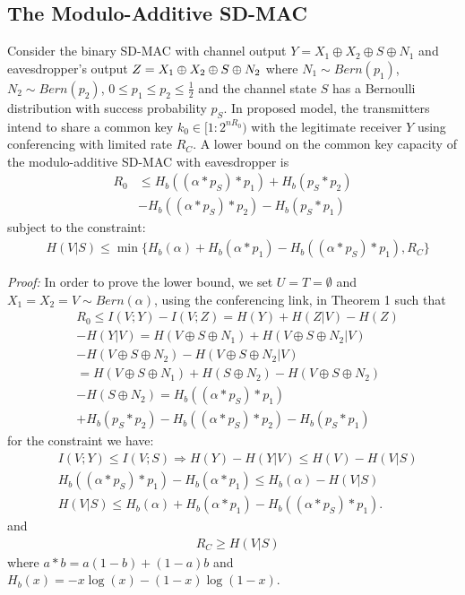 \documentclass[conference,8pt]{IEEEtran}
\begin{document}
{{\subsection{The Modulo-Additive SD-MAC}
Consider the binary SD-MAC with channel output ${Y=X_1 \oplus X_2 \oplus S \oplus N_1}$ and eavesdropper's output $Z=X_1 \\ \oplus X_2 \oplus S \oplus N_2$ where ${N_1 \sim Bern(p_1)}$, ${N_2 \sim Bern(p_2)}$, ${0 \leq p_1 \leq p_2 \leq \frac{1}{2}}$ and the channel state $S$ has a Bernoulli distribution with success probability $p_S$. In proposed model, the transmitters intend to share a common key ${k_0 \in [1:2^{nR_0})}$ with the legitimate receiver $Y$ using conferencing with limited rate $R_C$. A lower bound on the common key capacity of the modulo-additive SD-MAC with eavesdropper is 
\begin{align}
R_0 &\leq H_b((\alpha \ast p_S) \ast p_1)+H_b(p_S \ast p_2)\nonumber \\
&-H_b((\alpha \ast p_S) \ast p_2)-H_b(p_S \ast p_1) \nonumber
\end{align}
subject to the constraint:
\begin{align}
&H(V|S) \leq \min \{ H_b(\alpha)+H_b(\alpha \ast p_1)-H_b((\alpha \ast p_S) \ast p_1) , R_C \} \nonumber
\end{align}

\emph{Proof:} In order to prove the lower bound, we set $U=T= \emptyset$ and $X_1=X_2=V \sim Bern(\alpha)$, using the conferencing link, in Theorem 1 such that
\begin{align}
&R_0 \leq I(V;Y)-I(V;Z) = H(Y)+H(Z|V)-H(Z) \nonumber \\
&-H(Y|V)=H(V \oplus S \oplus N_1)+H(V \oplus S \oplus N_2|V) \nonumber \\
&-H(V \oplus S \oplus N_2)-H(V \oplus S \oplus N_2|V) \nonumber \\
&=H(V \oplus S \oplus N_1)+H(S \oplus N_2)-H(V \oplus S \oplus N_2) \nonumber \\
&-H(S \oplus N_2)=H_b((\alpha \ast p_S) \ast p_1) \nonumber \\
&+H_b(p_S \ast p_2)-H_b((\alpha \ast p_S) \ast p_2)-H_b(p_S \ast p_1) \nonumber
\end{align}
for the constraint we have:
\begin{align}
& I(V;Y) \leq I(V;S) \Rightarrow H(Y)-H(Y|V) \leq H(V)-H(V|S) \nonumber \\
& H_b((\alpha \ast p_S) \ast p_1)-H_b(\alpha \ast p_1) \leq H_b(\alpha)-H(V|S) \nonumber \\
& H(V|S) \leq H_b(\alpha)+H_b(\alpha \ast p_1)-H_b((\alpha \ast p_S) \ast p_1). \nonumber
\end{align}
and
\begin{align}
&R_C \geq H(V|S) \nonumber
\end{align}where $a \ast b = a(1-b)+(1-a)b$ and $H_b(x)=-x \log(x)-(1-x) \log(1-x)$.

}}
\end{document}
